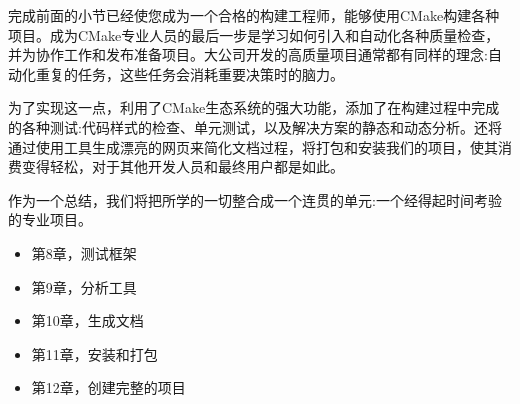 

完成前面的小节已经使您成为一个合格的构建工程师，能够使用CMake构建各种项目。成为CMake专业人员的最后一步是学习如何引入和自动化各种质量检查，并为协作工作和发布准备项目。大公司开发的高质量项目通常都有同样的理念:自动化重复的任务，这些任务会消耗重要决策时的脑力。

为了实现这一点，利用了CMake生态系统的强大功能，添加了在构建过程中完成的各种测试:代码样式的检查、单元测试，以及解决方案的静态和动态分析。还将通过使用工具生成漂亮的网页来简化文档过程，将打包和安装我们的项目，使其消费变得轻松，对于其他开发人员和最终用户都是如此。

作为一个总结，我们将把所学的一切整合成一个连贯的单元:一个经得起时间考验的专业项目。

\begin{itemize}
\item 第8章，测试框架
\item 第9章，分析工具
\item 第10章，生成文档
\item 第11章，安装和打包
\item 第12章，创建完整的项目
\end{itemize}